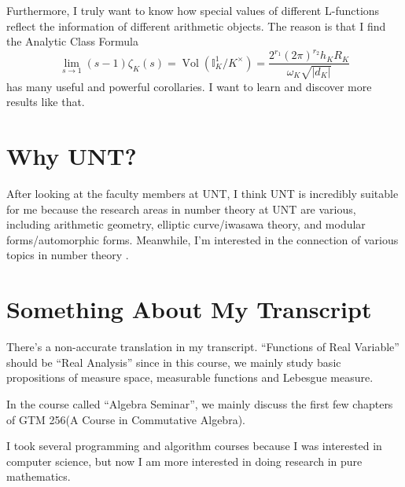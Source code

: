 \documentclass[12pt]{article}
\newcommand{\bb}[1]{\mathbb{#1}}
\theoremstyle{definition}
\begin{document}
Furthermore, I truly want to know how special values of different 
L-functions reflect the information of different arithmetic objects. 
The reason is that 
I find the Analytic Class Formula
$$
\lim_{s\rightarrow 1}(s-1)\zeta_K(s)=\operatorname{Vol}\left(\bb{I}_K^1/K^\times\right)=\frac{2^{r_1}(2\pi)^{r_2}h_K R_K}{\omega_K \sqrt{|d_K|}}
$$
has many useful and powerful corollaries. I want to learn and discover more results like that.

\section{Why UNT?}
After looking at the faculty members at UNT, I think UNT is incredibly 
suitable for me because the research areas in number theory at UNT are various, including  
arithmetic geometry, elliptic curve/iwasawa theory, and modular forms/automorphic forms. 
Meanwhile, I'm interested in the connection of various topics in number theory .
\section{Something About My Transcript}
There's a non-accurate translation in my transcript.
“Functions of Real Variable” should be “Real Analysis” since in this course, we mainly study basic 
propositions of measure space, measurable functions and Lebesgue measure.

In the course called “Algebra Seminar”, we mainly discuss the first few chapters of 
GTM 256(A Course in Commutative Algebra).

I took several programming and algorithm courses because I was interested in computer science, but now I am more interested in doing research in pure mathematics.
\end{document}
